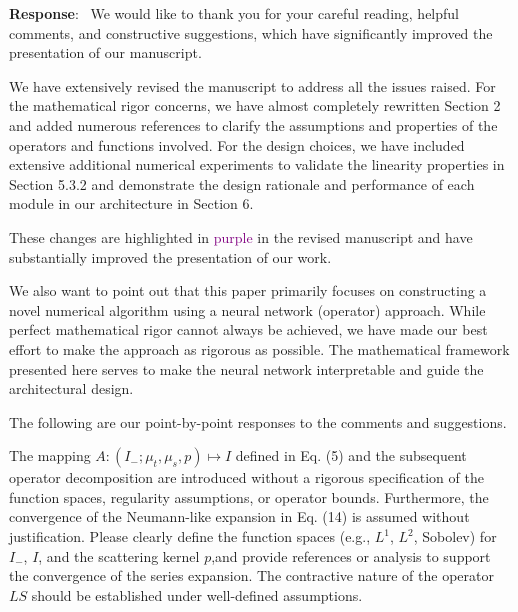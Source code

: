 \documentclass[12pt]{article}
\newcounter{reviewer}
\newcounter{point}[reviewer]
\renewcommand{\thepoint}{P\,\thereviewer.\arabic{point}}
\newenvironment{point}{\refstepcounter{point} \bigskip \noindent {\textbf{[Reviewer~Point~\thepoint]} }  }{\par }
\newenvironment{reply}{\medskip \noindent \textbf{Response}:\  \color{blue}\ignorespaces}{\medskip}
\begin{document}
\begin{reply}
	We would like to thank you for your careful reading, helpful comments, and constructive suggestions, which have significantly improved the presentation of our manuscript.

	We have extensively revised the manuscript to address all the issues raised. For the mathematical rigor concerns, we have almost completely rewritten Section 2 and added numerous references to clarify the assumptions and properties of the operators and functions involved. For the design choices, we have included extensive additional numerical experiments to validate the linearity properties in Section 5.3.2 and demonstrate the design rationale and performance of each module in our architecture in Section 6.

	These changes are highlighted in \textcolor{purple}{purple} in the revised manuscript and have substantially improved the presentation of our work.

	We also want to point out that this paper primarily focuses on constructing a novel numerical algorithm using a neural network (operator) approach. While perfect mathematical rigor cannot always be achieved, we have made our best effort to make the approach as rigorous as possible. The mathematical framework presented here serves to make the neural network interpretable and guide the architectural design.

	The following are our point-by-point responses to the comments and suggestions.
\end{reply}

\begin{point}
	The mapping $A: (I_{-};\mu_t,\mu_s,p) \mapsto I$ defined in Eq. (5) and the subsequent operator decomposition are introduced without a rigorous specification of the function spaces, regularity assumptions, or operator bounds. Furthermore, the convergence of the Neumann-like expansion in Eq. (14)
	is assumed without justification. Please clearly define the function spaces (e.g., $L^1$, $L^2$, Sobolev) for $I_{-}$, $I$, and the scattering kernel $p$,and provide references or analysis to support the convergence of the series expansion. The contractive nature of the operator $LS$ should be established under well-defined assumptions.
\end{point}
\end{document}
